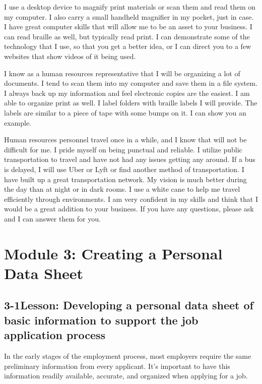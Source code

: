 I use a desktop device to magnify print materials or scan them and read them on my computer. I also carry a small handheld magnifier in my pocket, just in case. I have great computer skills that will allow me to be an asset to your business. I can read braille as well, but typically read print. I can demonstrate some of the technology that I use, so that you get a better idea, or I can direct you to a few websites that show videos of it being used.

I know as a human resources representative that I will be organizing a lot of documents. I tend to scan them into my computer and save them in a file system. I always back up my information and feel electronic copies are the easiest. I am able to organize print as well. I label folders with braille labels I will provide. The labels are similar to a piece of tape with some bumps on it. I can show you an example.

Human resources personnel travel once in a while, and I know that will not be difficult for me. I pride myself on being punctual and reliable. I utilize public transportation to travel and have not had any issues getting any around. If a bus is delayed, I will use Uber or Lyft or find another method of transportation. I have built up a great transportation network. My vision is much better during the day than at night or in dark rooms. I use a white cane to help me travel efficiently through environments. I am very confident in my skills and think that I would be a great addition to your business. If you have any questions, please ask and I can answer them for you.
  
\pagebreak \section*{Module 3:	Creating a Personal Data Sheet}
\noindent\makebox[\textwidth]{\rule{\linewidth}{0.4pt}}  \localtableofcontents 
\noindent\makebox[\textwidth]{\rule{\linewidth}{0.4pt}} 


\pagebreak \subsection*{3-1\quad Lesson: Developing a personal data sheet of basic information to support the job application process}
In the early stages of the employment process, most employers require the same preliminary information from every applicant. It's important to have this information readily available, accurate, and organized when applying for a job.

